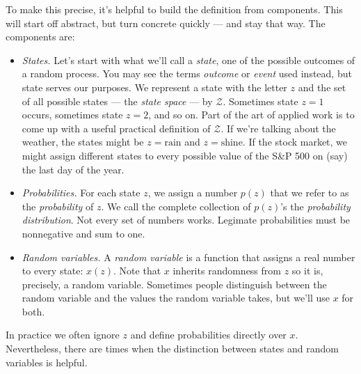 \documentclass[11pt]{article}
\begin{document}
To make this precise, it's helpful to build the definition
from components.
This will start off abstract, but turn concrete quickly --- and stay that way.
The components are:
%
\begin{itemize}
\item {\it States.\/}  Let's start with what we'll call a {\it state\/},
one of the possible outcomes of a random process.
You may see the terms {\it outcome\/} or {\it event} used instead,
but state serves our purposes.
We represent a state with the letter $z$
and the set of all possible states --- the {\it state space\/} --- by $\mathcal{Z}$.
Sometimes state $z=1$ occurs, sometimes state $z=2$, and so on.
Part of the art of applied work is to come up with
a useful practical definition of $\mathcal{Z}$.
If we're talking about the weather, the states might be
$z = \mbox{rain}$ and $z = \mbox{shine}$.
If the stock market, we might assign different states to every possible value
of the S\&P 500 on (say) the last day of the year.

\item {\it Probabilities.\/}
For each state $z$, we assign a number $p(z)$
that we refer to as the {\it probability\/} of $z$.
We call the complete collection of $p(z)$'s
the {\it probability distribution\/}.
Not every set of numbers works.
Legimate probabilities must be nonnegative and sum to one.


\item {\it Random variables.\/}
A {\it random variable\/} is a function that
assigns a real number to every state:  $x(z)$.
Note that $x$ inherits randomness from $z$ so it is, precisely,
a random variable.
Sometimes people distinguish between the random variable
and the values the random variable takes,
but we'll use $x$ for both.
\end{itemize}
%
In practice we often ignore $z$
and define probabilities directly over $x$.
Nevertheless, there are times when the distinction
between states and random variables is helpful.
\end{document}
